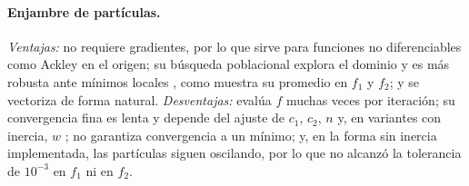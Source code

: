 \paragraph{Enjambre de partículas.}
\emph{Ventajas:} no requiere gradientes, por lo que sirve para funciones no
diferenciables como Ackley en el origen; su búsqueda poblacional explora
el dominio y es más robusta ante mínimos locales
\cite{kennedy1995particle}, como muestra su promedio en $f_1$ y $f_2$; y se
vectoriza de forma natural. \emph{Desventajas:} evalúa $f$ muchas veces por
iteración; su convergencia fina es lenta y depende del ajuste de $c_1$,
$c_2$, $n$ y, en variantes con inercia, $w$
\cite{shi1998modified,clerc2002particle}; no garantiza convergencia a un
mínimo; y, en la forma sin inercia implementada, las partículas siguen
oscilando, por lo que no alcanzó la tolerancia de $10^{-3}$ en $f_1$ ni en
$f_2$.
